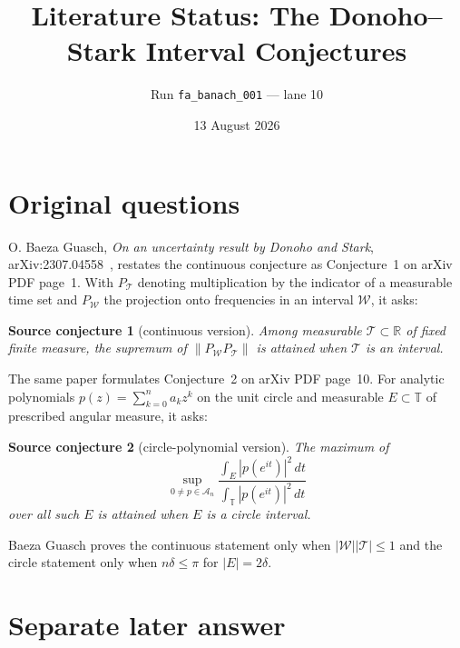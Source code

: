 \documentclass[11pt]{article}
\title{Literature Status: The Donoho--Stark Interval Conjectures}
\author{Run \texttt{fa\_banach\_001} --- lane 10}
\date{13 August 2026}
\newtheorem*{sourceconjecture}{Source conjecture}
\begin{document}
\maketitle

\begin{center}
\end{center}

\section{Original questions}

O. Baeza Guasch, \emph{On an uncertainty result by Donoho and Stark},
arXiv:2307.04558~\cite{source}, restates the continuous conjecture as
Conjecture~1 on arXiv PDF page~1.  With $P_{\mathcal T}$ denoting
multiplication by the indicator of a measurable time set and
$P_{\mathcal W}$ the projection onto frequencies in an interval
$\mathcal W$, it asks:

\begin{sourceconjecture}[continuous version]
Among measurable $\mathcal T\subset\mathbb R$ of fixed finite measure, the
supremum of $\lVert P_{\mathcal W}P_{\mathcal T}\rVert$ is attained when
$\mathcal T$ is an interval.
\end{sourceconjecture}

The same paper formulates Conjecture~2 on arXiv PDF page~10.  For analytic
polynomials $p(z)=\sum_{k=0}^{n}a_kz^k$ on the unit circle and measurable
$E\subset\mathbb T$ of prescribed angular measure, it asks:

\begin{sourceconjecture}[circle-polynomial version]
The maximum of
\[
  \sup_{0\ne p\in\mathcal A_n}
  \frac{\int_E |p(e^{it})|^2\,dt}
       {\int_{\mathbb T}|p(e^{it})|^2\,dt}
\]
over all such $E$ is attained when $E$ is a circle interval.
\end{sourceconjecture}

Baeza Guasch proves the continuous statement only when
$|\mathcal W||\mathcal T|\leq1$ and the circle statement only when
$n\delta\leq\pi$ for $|E|=2\delta$.

\section{Separate later answer}
\end{document}
